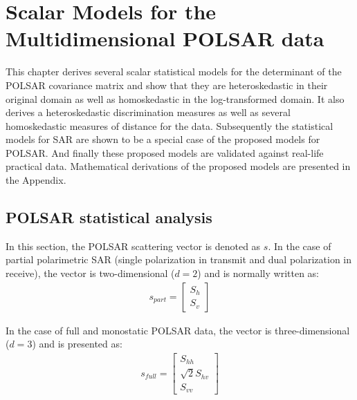 \chapter{Scalar Models for the Multidimensional POLSAR data} %
\label{chap:polsar}

This chapter derives several scalar statistical models for the
                determinant of the POLSAR covariance matrix and
                show that they are heteroskedastic in their original
                domain as well as homoskedastic in the log-transformed
                domain.
It
                also derives a heteroskedastic discrimination measures
                 as well as several homoskedastic measures of
                distance for the data.
Subsequently the statistical models for SAR are shown to be a special case of
                the proposed models for POLSAR. 
And finally these proposed models are validated against real-life practical data.
Mathematical derivations of the proposed models are presented in the Appendix. %

\section{POLSAR statistical analysis}

In this section, the POLSAR scattering vector is denoted as $s$.
In the case of partial polarimetric SAR (single polarization in transmit and dual polarization in receive),
  the vector is two-dimensional ($d=2$) and is normally written as: 
\begin{align}  
s_{part}=\begin{bmatrix}
S_h\\ 
S_v
\end{bmatrix}
\end{align}

In the case of full and monostatic POLSAR data,
  the vector is three-dimensional ($d=3$) and is presented as:
\begin{align}
s_{full}=\begin{bmatrix}
S_{hh}\\
\sqrt{2}S_{hv}\\
S_{vv}
\end{bmatrix}
\end{align}

